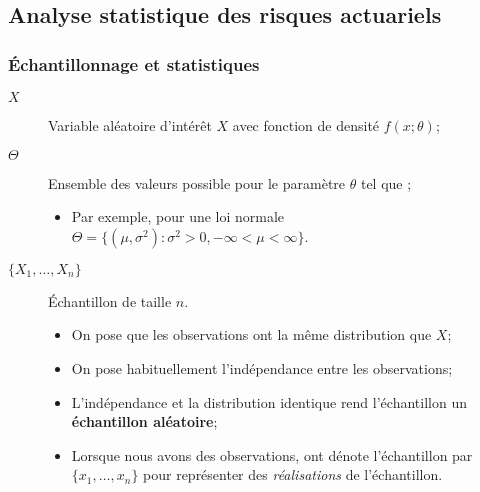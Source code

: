 \documentclass[10pt, french]{article}
\begin{document}
\raggedcolumns
\begin{multicols*}{2}

\part{Analyse statistique des risques actuariels}

\section{Échantillonnage et statistiques}
\begin{distributions}[Notation]
\begin{description}
	\item[$X$]	Variable aléatoire d'intérêt $X$ avec fonction de densité $f(x; \theta)$;
	\item[$\Theta$]	Ensemble des valeurs possible pour le paramètre $\theta$ tel que \lfbox[formula]{$\theta \in \Theta$};
		\begin{itemize}
		\item	Par exemple, pour une loi normale $\Theta	=	\{(\mu, \sigma^{2}): \sigma^{2} > 0, -\infty < \mu < \infty\}$.
		\end{itemize}
	\item[$\{X_{1}, \dots, X_{n}\}$]	Échantillon de taille $n$.
		\begin{itemize}
		\item	On pose que les observations ont la même distribution que $X$;
		\item	On pose habituellement l'indépendance entre les observations;
		\item	L'indépendance et la distribution identique rend l'échantillon un \textbf{échantillon aléatoire};
		\item	Lorsque nous avons des observations, ont dénote l'échantillon par $\{x_{1}, \dots, x_{n}\}$ pour représenter des \textit{réalisations} de l'échantillon.
		\end{itemize}
\end{description}
\end{distributions}





\end{multicols*}
\end{document}
